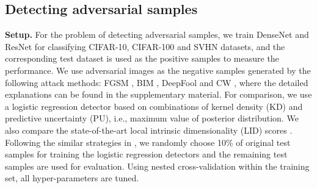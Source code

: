 \documentclass{article}
\begin{document}
\subsection{Detecting adversarial samples} \label{sec:exp_adv}


{\bf Setup.} For the problem of detecting adversarial samples, 
we train DenseNet and ResNet for classifying CIFAR-10, CIFAR-100 and SVHN datasets, 
and the corresponding test dataset is used as the positive samples to measure the performance.
We use adversarial images as the negative samples generated by the following attack methods: 
FGSM \citep{goodfellow2014explaining}, BIM \citep{kurakin2016adversarial}, DeepFool \citep{moosavi2016deepfool} and CW \citep{carlini2017adversarial}, where the detailed explanations can be found in the supplementary material.
For comparison, 
we use a logistic regression detector based on combinations of kernel density (KD) \citep{feinman2017detecting} and predictive uncertainty (PU), i.e., maximum value of posterior distribution.
We also compare the state-of-the-art local intrinsic dimensionality (LID) scores \citep{ma2018characterizing}.
Following the similar strategies in \citep{feinman2017detecting, ma2018characterizing},
we randomly choose 10\% of original test samples for training the logistic regression detectors and the remaining test samples are used for evaluation.
Using nested cross-validation within the training set, all hyper-parameters are tuned.
\end{document}
